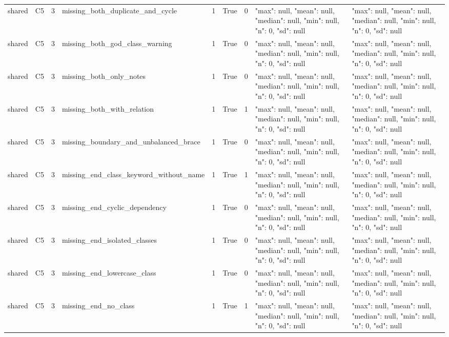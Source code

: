 \begin{tabular}{lllllllll}
shared & C5 & 3 & missing\_both\_duplicate\_and\_cycle & 1 & True & 0 & {"max": null, "mean": null, "median": null, "min": null, "n": 0, "sd": null} & {"max": null, "mean": null, "median": null, "min": null, "n": 0, "sd": null} \\
shared & C5 & 3 & missing\_both\_god\_class\_warning & 1 & True & 0 & {"max": null, "mean": null, "median": null, "min": null, "n": 0, "sd": null} & {"max": null, "mean": null, "median": null, "min": null, "n": 0, "sd": null} \\
shared & C5 & 3 & missing\_both\_only\_notes & 1 & True & 0 & {"max": null, "mean": null, "median": null, "min": null, "n": 0, "sd": null} & {"max": null, "mean": null, "median": null, "min": null, "n": 0, "sd": null} \\
shared & C5 & 3 & missing\_both\_with\_relation & 1 & True & 1 & {"max": null, "mean": null, "median": null, "min": null, "n": 0, "sd": null} & {"max": null, "mean": null, "median": null, "min": null, "n": 0, "sd": null} \\
shared & C5 & 3 & missing\_boundary\_and\_unbalanced\_brace & 1 & True & 0 & {"max": null, "mean": null, "median": null, "min": null, "n": 0, "sd": null} & {"max": null, "mean": null, "median": null, "min": null, "n": 0, "sd": null} \\
shared & C5 & 3 & missing\_end\_class\_keyword\_without\_name & 1 & True & 1 & {"max": null, "mean": null, "median": null, "min": null, "n": 0, "sd": null} & {"max": null, "mean": null, "median": null, "min": null, "n": 0, "sd": null} \\
shared & C5 & 3 & missing\_end\_cyclic\_dependency & 1 & True & 0 & {"max": null, "mean": null, "median": null, "min": null, "n": 0, "sd": null} & {"max": null, "mean": null, "median": null, "min": null, "n": 0, "sd": null} \\
shared & C5 & 3 & missing\_end\_isolated\_classes & 1 & True & 0 & {"max": null, "mean": null, "median": null, "min": null, "n": 0, "sd": null} & {"max": null, "mean": null, "median": null, "min": null, "n": 0, "sd": null} \\
shared & C5 & 3 & missing\_end\_lowercase\_class & 1 & True & 0 & {"max": null, "mean": null, "median": null, "min": null, "n": 0, "sd": null} & {"max": null, "mean": null, "median": null, "min": null, "n": 0, "sd": null} \\
shared & C5 & 3 & missing\_end\_no\_class & 1 & True & 1 & {"max": null, "mean": null, "median": null, "min": null, "n": 0, "sd": null} & {"max": null, "mean": null, "median": null, "min": null, "n": 0, "sd": null} \\

\end{tabular}
